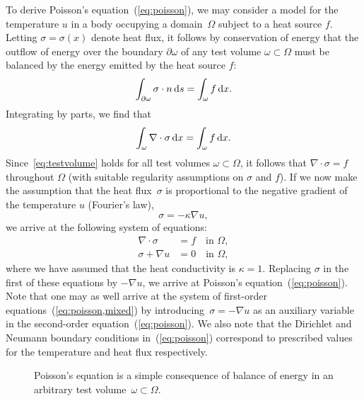 To derive Poisson's equation~(\ref{eq:poisson}), we may consider a
model for the temperature $u$ in a body occupying a domain~$\Omega$
subject to a heat source $f$. Letting $\sigma = \sigma(x)$ denote heat
flux, it follows by conservation of energy that the outflow of energy
over the boundary $\partial\omega$ of any test volume
$\omega\subset\Omega$ must be balanced by the energy emitted by the
heat source $f$:
\begin{equation}
  \int_{\partial\omega} \sigma \cdot n \, \mathrm{d}s = \int_{\omega} f \, \mathrm{d}x.
\end{equation}
Integrating by parts, we find that
\begin{equation} \label{eq:testvolume}
  \int_{\omega} \nabla \cdot \sigma \, \mathrm{d}x = \int_{\omega} f \, \mathrm{d}x.
\end{equation}
Since~\eqref{eq:testvolume} holds for all test volumes
$\omega \subset \Omega$, it follows that $\nabla \cdot \sigma = f$
throughout $\Omega$ (with suitable regularity assumptions on $\sigma$
and $f$). If we now make the assumption that the heat flux~$\sigma$ is
proportional to the negative gradient of the temperature $u$
(Fourier's law), 
\begin{equation}
  \sigma = -\kappa \nabla u,
\end{equation}
we arrive at
the following system of equations:
\begin{equation}
\label{eq:poisson,mixed}
  \begin{split}
    \nabla \cdot \sigma &= f \quad \mbox{in } \Omega, \\
    \sigma + \nabla u   &= 0   \quad \mbox{in } \Omega,
\end{split}
\end{equation}
where we have assumed that the heat conductivity is $\kappa = 1$.
Replacing $\sigma$ in the first of these equations by $-\nabla u$, we
arrive at Poisson's equation~(\ref{eq:poisson}). Note that one may as
well arrive at the system of first-order
equations~(\ref{eq:poisson,mixed}) by introducing~$\sigma = -\nabla u$
as an auxiliary variable in the second-order
equation~(\ref{eq:poisson}). We also note that the Dirichlet and
Neumann boundary conditions in~(\ref{eq:poisson}) correspond to
prescribed values for the temperature and heat flux respectively.

\begin{figure}
\bwfig
  \caption{Poisson's equation is a simple consequence of balance of
    energy in an arbitrary test volume~$\omega \subset \Omega$.}
\end{figure}

